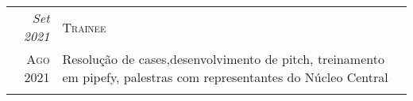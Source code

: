 \begin{mdframed}
\begin{tabular}{r|p{15cm}}
    \emph{Set 2021}   & \textsc{Trainee}                                                                                                                                                                                                                                                                                              \\
    \textsc{Ago 2021} & \footnotesize{Resolução de cases,desenvolvimento de pitch, treinamento em pipefy, palestras com representantes do Núcleo Central}                                                                                                                                                                             \\
    \multicolumn{2}{c}{}                                                                                                                                                                                                                                                                                                              \\
  \end{tabular}

\end{mdframed}


